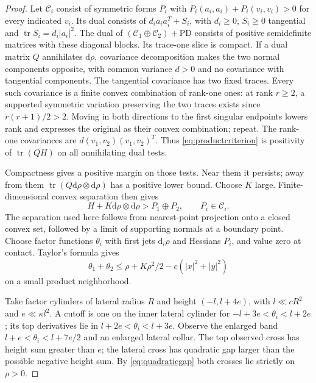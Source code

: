 \documentclass[11pt]{article}
\theoremstyle{definition}\newtheorem{definition}[theorem]{Definition}
\theoremstyle{remark}\newtheorem{remark}[theorem]{Remark}
\newcommand{\dd}{\mathrm d}
\newcommand{\tr}{\operatorname{tr}}
\begin{document}
\begin{proof}
Let $\mathcal C_i$ consist of symmetric forms $P_i$ with
$P_i(a_i,a_i)+P_i(v_i,v_i)>0$ for every indicated $v_i$.
Its dual consists of $d_ia_ia_i^T+S_i$, with $d_i\ge0$,
$S_i\ge0$ tangential and $\tr S_i=d_i|a_i|^2$.
The dual of $(\mathcal C_1\oplus\mathcal C_2)+\mathrm{PD}$ consists of
positive semidefinite matrices with these diagonal blocks.
Its trace-one slice is compact. If a dual matrix $Q$ annihilates
$\dd\rho$, covariance decomposition makes the two normal components
opposite, with common variance $d>0$ and no covariance with tangential
components. The tangential covariance has two fixed traces.
Every such covariance is a finite convex combination of rank-one ones:
at rank $r\ge2$, a supported symmetric variation preserving the two traces
exists since $r(r+1)/2>2$. Moving in both directions to the first singular
endpoints lowers rank and expresses the original as their convex
combination; repeat. The rank-one covariances are
$d(v_1,v_2)(v_1,v_2)^T$. Thus \eqref{eq:productcriterion} is positivity of
$\tr(QH)$ on all annihilating dual tests.

Compactness gives a positive margin on those tests. Near them it persists;
away from them $\tr(Q\dd\rho\otimes\dd\rho)$ has a positive lower bound.
Choose $K$ large. Finite-dimensional convex separation then gives
\[
 H+K\dd\rho\otimes\dd\rho>P_1\oplus P_2,\qquad P_i\in\mathcal C_i.
\]
The separation used here follows from nearest-point projection onto a
closed convex set, followed by a limit of supporting normals at a boundary
point. Choose factor functions $\theta_i$ with first jets $\dd_i\rho$ and
Hessians $P_i$, and value zero at contact. Taylor's formula gives
\begin{equation}\label{eq:quadraticgap}
 \theta_1+\theta_2\le\rho+K\rho^2/2-c(|x|^2+|y|^2)
\end{equation}
on a small product neighborhood.

Take factor cylinders of lateral radius $R$ and height $(-l,l+4e)$,
with $l\ll cR^2$ and $e\ll\kappa l^2$. A cutoff is one on the inner
lateral cylinder for $-l+3e<\theta_i<l+2e$; its top derivatives lie in
$l+2e<\theta_i<l+3e$. Observe the enlarged band
$l+e<\theta_i<l+7e/2$ and an enlarged lateral collar.
The top observed cross has height sum greater than $e$; the lateral
cross has quadratic gap larger than the possible negative height sum.
By \eqref{eq:quadraticgap} both crosses lie strictly on $\rho>0$.


\end{proof}
\end{document}
